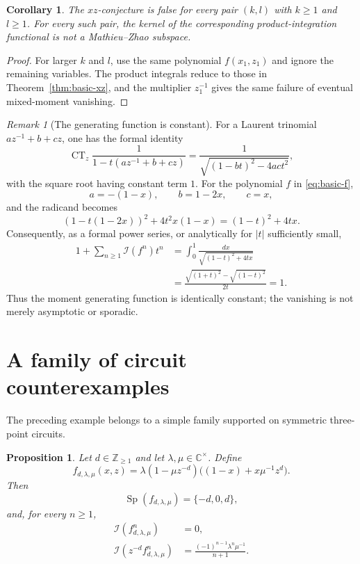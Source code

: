 \documentclass[11pt]{article}
\newcommand{\C}{\mathbb C}
\newcommand{\CT}{\operatorname{CT}}
\newcommand{\Sp}{\operatorname{Sp}}
\newcommand{\I}{\mathcal I}
\newtheorem{proposition}[theorem]{Proposition}
\newtheorem{corollary}[theorem]{Corollary}
\theoremstyle{remark}
\newtheorem{remark}[theorem]{Remark}
\begin{document}
\begin{corollary}\label{cor:all-mixed-xz}
The $xz$-conjecture is false for every pair $(k,l)$ with $k\geq1$ and $l\geq1$.  For every such pair, the kernel of the corresponding product-integration functional is not a Mathieu--Zhao subspace.
\end{corollary}

\begin{proof}
For larger $k$ and $l$, use the same polynomial $f(x_1,z_1)$ and ignore the remaining variables.  The product integrals reduce to those in Theorem~\ref{thm:basic-xz}, and the multiplier $z_1^{-1}$ gives the same failure of eventual mixed-moment vanishing.
\end{proof}

\begin{remark}[The generating function is constant]\label{rem:generating}
For a Laurent trinomial $az^{-1}+b+cz$, one has the formal identity
\[
  \CT_z\frac{1}{1-t(az^{-1}+b+cz)}
  =\frac{1}{\sqrt{(1-bt)^2-4act^2}},
\]
with the square root having constant term $1$.  For the polynomial $f$ in \eqref{eq:basic-f},
\[
  a=-(1-x),\qquad b=1-2x,\qquad c=x,
\]
and the radicand becomes
\[
  (1-t(1-2x))^2+4t^2x(1-x)
  =(1-t)^2+4tx.
\]
Consequently, as a formal power series, or analytically for $|t|$ sufficiently small,
\begin{align*}
  1+\sum_{n\geq1}\I(f^n)t^n
  &=\int_0^1\frac{dx}{\sqrt{(1-t)^2+4tx}}\\
  &=\frac{\sqrt{(1+t)^2}-\sqrt{(1-t)^2}}{2t}=1.
\end{align*}
Thus the moment generating function is identically constant; the vanishing is not merely asymptotic or sporadic.
\end{remark}

\section{A family of circuit counterexamples}

The preceding example belongs to a simple family supported on symmetric three-point circuits.

\begin{proposition}\label{prop:family}
Let $d\in\mathbb Z_{\geq1}$ and let $\lambda,\mu\in\C^\times$.  Define
\begin{equation}\label{eq:family}
  f_{d,\lambda,\mu}(x,z)
  =\lambda(1-\mu z^{-d})
   \bigl((1-x)+x\mu^{-1}z^d\bigr).
\end{equation}
Then
\[
  \Sp(f_{d,\lambda,\mu})=\{-d,0,d\},
\]
and, for every $n\geq1$,
\begin{align}
  \I(f_{d,\lambda,\mu}^n)&=0,
  \label{eq:family-pure}\\
  \I(z^{-d}f_{d,\lambda,\mu}^n)
  &=\frac{(-1)^{n-1}\lambda^n\mu^{-1}}{n+1}.
  \label{eq:family-mixed}
\end{align}
\end{proposition}
\end{document}
